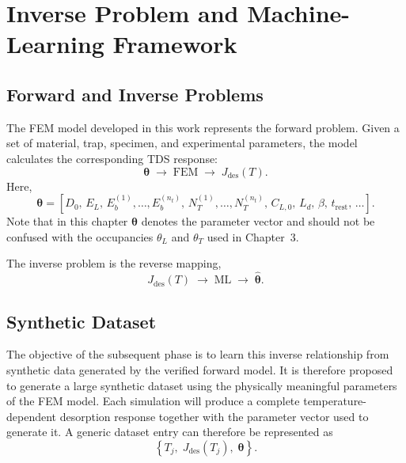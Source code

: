 \documentclass[a4paper,12pt,oneside]{report}
\begin{document}
\chapter{Inverse Problem and Machine-Learning Framework}
\label{ch:inverse}
 
\section{Forward and Inverse Problems}
\label{sec:fwd-inv}
 
The FEM model developed in this work represents the forward problem. Given a set
of material, trap, specimen, and experimental parameters, the model calculates the
corresponding TDS response:
\begin{equation}
  \boldsymbol{\theta} \;\longrightarrow\; \text{FEM} \;\longrightarrow\; J_{\mathrm{des}}(T).
  \label{eq:forward}
\end{equation}
Here,
\begin{equation}
  \boldsymbol{\theta} = \left[ D_0,\, E_L,\, E_b^{(1)},\dots,E_b^{(n_t)},\,
  N_T^{(1)},\dots,N_T^{(n_t)},\, C_{L,0},\, L_d,\, \beta,\, t_{\mathrm{rest}},\, \dots \right].
  \label{eq:theta}
\end{equation}
Note that in this chapter $\boldsymbol{\theta}$ denotes the parameter vector and
should not be confused with the occupancies $\theta_L$ and $\theta_T$ used in
Chapter~3.
 
The inverse problem is the reverse mapping,
\begin{equation}
  J_{\mathrm{des}}(T) \;\longrightarrow\; \text{ML} \;\longrightarrow\; \hat{\boldsymbol{\theta}}.
  \label{eq:inverse}
\end{equation}
 
\section{Synthetic Dataset}
\label{sec:dataset}
 
The objective of the subsequent phase is to learn this inverse relationship from
synthetic data generated by the verified forward model. It is therefore proposed to
generate a large synthetic dataset using the physically meaningful parameters of the
FEM model. Each simulation will produce a complete temperature-dependent desorption
response together with the parameter vector used to generate it. A generic dataset
entry can therefore be represented as
\begin{equation}
  \left\{ T_j,\; J_{\mathrm{des}}(T_j),\; \boldsymbol{\theta} \right\}.
  \label{eq:entry}
\end{equation}
 
\end{document}
